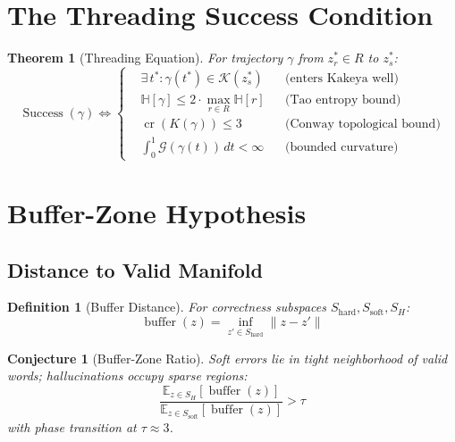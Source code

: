 \documentclass[12pt]{article}
\newtheorem{theorem}{Theorem}
\newtheorem{definition}{Definition}
\newtheorem{conjecture}{Conjecture}
\begin{document}
\section{The Threading Success Condition}

\begin{theorem}[Threading Equation]
For trajectory $\gamma$ from $z_r^* \in R$ to $z_s^*$:
\begin{equation}
\boxed{
\operatorname{Success}(\gamma) \iff \left\{
\begin{aligned}
&\exists \, t^* : \gamma(t^*) \in \mathcal{K}(z_s^*) && \text{(enters Kakeya well)} \\
&\mathbb{H}[\gamma] \le 2 \cdot \max_{r \in R} \mathbb{H}[r] && \text{(Tao entropy bound)} \\
&\operatorname{cr}(K(\gamma)) \le 3 && \text{(Conway topological bound)} \\
&\int_0^1 \mathcal{G}(\gamma(t)) \, dt < \infty && \text{(bounded curvature)}
\end{aligned}
\right.
}
\end{equation}
\end{theorem}

\section{Buffer-Zone Hypothesis}

\subsection{Distance to Valid Manifold}

\begin{definition}[Buffer Distance]
For correctness subspaces $S_{\text{hard}}, S_{\text{soft}}, S_H$:
\begin{equation}
\operatorname{buffer}(z) = \inf_{z' \in S_{\text{hard}}} \|z - z'\|
\end{equation}
\end{definition}

\begin{conjecture}[Buffer-Zone Ratio]
Soft errors lie in tight neighborhood of valid words; hallucinations occupy sparse regions:
\begin{equation}
\frac{\mathbb{E}_{z \in S_H}[\operatorname{buffer}(z)]}{\mathbb{E}_{z \in S_{\text{soft}}}[\operatorname{buffer}(z)]} > \tau
\end{equation}
with phase transition at $\tau \approx 3$.
\end{conjecture}
\end{document}
